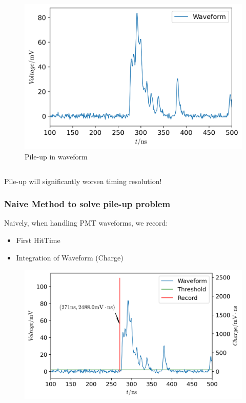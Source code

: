 \documentclass{beamer}
\begin{document}
\begin{frame}
\begin{columns}
\begin{figure}
    \centering
    \caption{Pile-up in waveform}
    \includegraphics[width=1.0\linewidth]{img/wave.png}
\end{figure}
\end{columns}
Pile-up will significantly worsen timing resolution! 
\end{frame}

\begin{frame}
\frametitle{Naive Method to solve pile-up problem}
\hspace{4mm}Naively, when handling PMT waveforms, we record:
\begin{itemize}
    \item First HitTime
    \item Integration of Waveform (Charge)
\end{itemize}
\begin{figure}
    \centering
    \includegraphics[width=0.8\linewidth]{img/previous.png}
\end{figure}
\end{frame}
\end{document}

